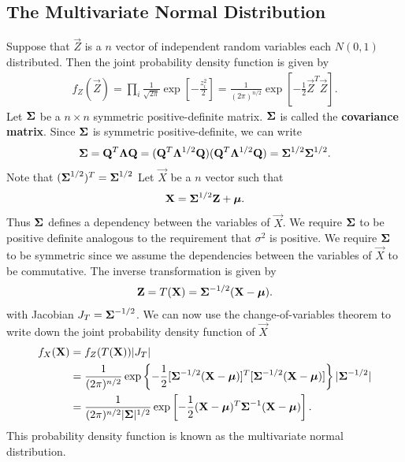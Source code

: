 \documentclass{memoir}
\begin{document}
\subsection{The Multivariate Normal Distribution}
Suppose that $\vec{Z}$ is a $n$ vector of independent random variables each $N(0,1)$ distributed. Then the joint probability density function is given by
\begin{align*}
    f_Z(\vec{Z}) = \prod_i \frac{1}{\sqrt{2 \pi}} \exp\left[-\frac{z_i^2}{2}\right] = \frac{1}{(2 \pi)^{n/2}} \exp\left[-\frac{1}{2}\vec{Z}^T \vec{Z}\right].
\end{align*}
Let $\boldsymbol{\mathbf{\Sigma}}$ be a $n \times n$ symmetric positive-definite matrix. $\boldsymbol{\mathbf{\Sigma}}$ is called the \textbf{covariance matrix}. Since $\boldsymbol{\mathbf{\Sigma}}$ is symmetric positive-definite, we can write
\begin{align*}
    \boldsymbol{\mathbf{\Sigma}} = \boldsymbol{\mathbf{Q}}^T \boldsymbol{\mathbf{\Lambda}} \boldsymbol{\mathbf{Q}} = (\boldsymbol{\mathbf{Q}}^T \boldsymbol{\mathbf{\Lambda}}^{1/2} \boldsymbol{\mathbf{Q}}) (\boldsymbol{\mathbf{Q}}^T \boldsymbol{\mathbf{\Lambda}}^{1/2} \boldsymbol{\mathbf{Q}}) = \boldsymbol{\mathbf{\Sigma}}^{1/2} \boldsymbol{\mathbf{\Sigma}}^{1/2}.
\end{align*}
Note that $(\boldsymbol{\mathbf{\Sigma}}^{1/2})^T = \boldsymbol{\mathbf{\Sigma}}^{1/2}$
Let $\vec{X}$ be a $n$ vector such that
\begin{align*}
    \boldsymbol{\mathbf{X}} = \boldsymbol{\mathbf{\Sigma}}^{1/2} \boldsymbol{\mathbf{Z}} + \boldsymbol{\mathbf{\mu}}.
\end{align*}
Thus $\boldsymbol{\mathbf{\Sigma}}$ defines a dependency between the variables of $\vec{X}$. We require $\boldsymbol{\mathbf{\Sigma}}$ to be positive definite analogous to the requirement that $\sigma^2$ is positive. We require $\boldsymbol{\mathbf{\Sigma}}$ to be symmetric since we assume the dependencies between the variables of $\vec{X}$ to be commutative. The inverse transformation is given by
\begin{align*}
    \boldsymbol{\mathbf{Z}} = T(\boldsymbol{\mathbf{X}}) = \boldsymbol{\mathbf{\Sigma}}^{-1/2}(\boldsymbol{\mathbf{X}}-\boldsymbol{\mathbf{\mu}}).
\end{align*}
with Jacobian $J_T = \boldsymbol{\mathbf{\Sigma}}^{-1/2}$. We can now use the change-of-variables theorem to write down the joint probability density function of $\vec{X}$
\begin{align*}
    f_X(\boldsymbol{\mathbf{X}}) &= f_Z(T(\boldsymbol{\mathbf{X}})) |J_T| \\
    &= \frac{1}{(2 \pi)^{n/2}} \exp\left\{-\frac{1}{2}[\boldsymbol{\mathbf{\Sigma}}^{-1/2}(\boldsymbol{\mathbf{X}}-\boldsymbol{\mathbf{\mu}})]^T [\boldsymbol{\mathbf{\Sigma}}^{-1/2}(\boldsymbol{\mathbf{X}}-\boldsymbol{\mathbf{\mu}})]\right\} |\boldsymbol{\mathbf{\Sigma}}^{-1/2}| \\
    &= \frac{1}{(2 \pi)^{n/2} |\boldsymbol{\mathbf{\Sigma}}|^{1/2}} \exp\left[-\frac{1}{2}(\boldsymbol{\mathbf{X}}-\boldsymbol{\mathbf{\mu}})^T \boldsymbol{\mathbf{\Sigma}}^{-1} (\boldsymbol{\mathbf{X}}-\boldsymbol{\mathbf{\mu}})\right].
\end{align*}
This probability density function is known as the multivariate normal distribution.
\end{document}
